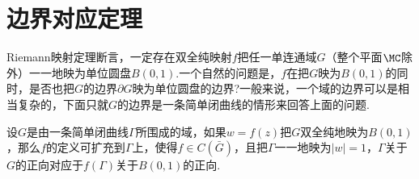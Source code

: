 \section{边界对应定理\label{sec7.3}}
Riemann映射定理断言，一定存在双全纯映射$f$把任一单连通域$G$（整个平面$\MC$除外）一一地映为单位圆盘$B(0,1)$.一个自然的问题是，$f$在把$G$映为$B(0,1)$的同时，是否也把$G$的边界$\partial G$映为单位圆盘的边界?一般来说，一个域的边界可以是相当复杂的，下面只就$G$的边界是一条简单闭曲线的情形来回答上面的问题.
\begin{theorem}\label{thm7.3.1}
设$G$是由一条简单闭曲线$\Gamma$所围成的域，如果$w=f(z)$把$G$双全纯地映为$B(0,1)$，那么$f$的定义可扩充到$\Gamma$上，使得$f\in C(\bar G)$，且把$\Gamma$一一地映为$|w|=1$，$\Gamma$关于$G$的正向对应于$f(\Gamma)$关于$B(0,1)$的正向.
\end{theorem}
